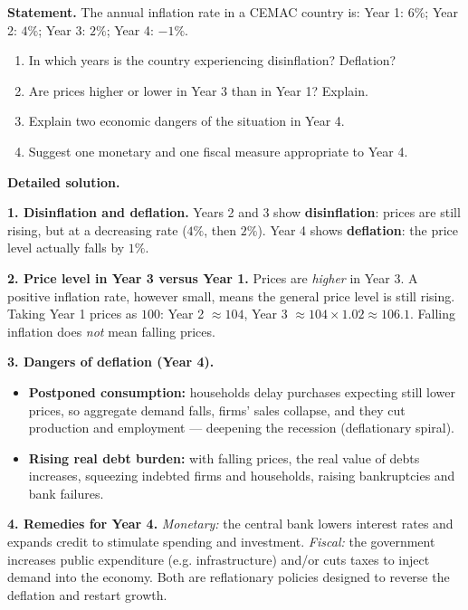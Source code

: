 \documentclass[11pt]{article}
\newcommand{\cle}[1]{{\popxbold\color{popdark}#1}}
\begin{document}
\begin{exoresolu}
\textbf{Statement.} The annual inflation rate in a CEMAC country is: Year 1: $6\%$; Year 2: $4\%$; Year 3: $2\%$; Year 4: $-1\%$.
\begin{enumerate}
\item In which years is the country experiencing disinflation? Deflation?
\item Are prices higher or lower in Year 3 than in Year 1? Explain.
\item Explain two economic dangers of the situation in Year 4.
\item Suggest one monetary and one fiscal measure appropriate to Year 4.
\end{enumerate}
\tcblower
\textbf{Detailed solution.}

\textbf{1. Disinflation and deflation.} Years 2 and 3 show \textbf{disinflation}: prices are still rising, but at a decreasing rate ($4\%$, then $2\%$). Year 4 shows \textbf{deflation}: the price level actually falls by $1\%$.

\textbf{2. Price level in Year 3 versus Year 1.} Prices are \emph{higher} in Year 3. A positive inflation rate, however small, means the general price level is still rising. Taking Year 1 prices as $100$: Year 2 $\approx 104$, Year 3 $\approx 104 \times 1.02 \approx 106.1$. Falling inflation does \emph{not} mean falling prices.

\textbf{3. Dangers of deflation (Year 4).}
\begin{itemize}
\item \textbf{Postponed consumption:} households delay purchases expecting still lower prices, so aggregate demand falls, firms' sales collapse, and they cut production and employment — deepening the recession (deflationary spiral).
\item \textbf{Rising real debt burden:} with falling prices, the real value of debts increases, squeezing indebted firms and households, raising bankruptcies and bank failures.
\end{itemize}

\textbf{4. Remedies for Year 4.} \emph{Monetary:} the central bank lowers interest rates and expands credit to stimulate spending and investment. \emph{Fiscal:} the government increases public expenditure (e.g. infrastructure) and/or cuts taxes to inject demand into the economy. Both are \cle{reflationary} policies designed to reverse the deflation and restart growth.
\end{exoresolu}
\end{document}
